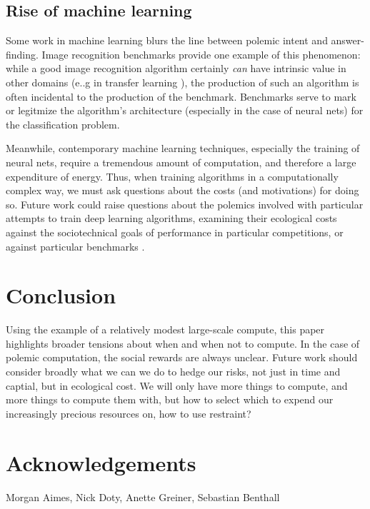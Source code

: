 \documentclass[sigconf]{acmart}
\begin{document}
\subsection{Rise of machine learning}
\label{sec:org61152f0}

Some work in machine learning blurs the line 
between polemic intent and answer-finding.
Image recognition benchmarks provide one example of this phenomenon:
while a good image recognition algorithm certainly \emph{can} have intrinsic value in other domains 
(e..g in transfer learning \cite{Jean2016c}),
the production of such an algorithm is often incidental to the production of the benchmark.
Benchmarks serve to mark or legitmize the algorithm's architecture (especially in the case of neural nets)
for the classification problem.

Meanwhile, contemporary machine learning techniques, especially the training of neural nets, 
require a tremendous amount of computation, and therefore a large expenditure of energy.
Thus, when training algorithms in a computationally complex way,
we must ask questions about the costs (and motivations) for doing so.
Future work could raise questions about the polemics involved
with particular attempts to train deep learning algorithms,
examining their ecological costs against the sociotechnical goals 
of performance in particular competitions, or against particular benchmarks \cite{SixSilberman2015}.


\section{Conclusion}
\label{sec:orgcca7631}

Using the example of a relatively modest large-scale compute,
this paper highlights broader tensions about when and when not to compute.
In the case of polemic computation, the social rewards are always unclear.
Future work should consider broadly what we can we do to hedge our risks, 
not just in time and captial,
but in ecological cost.
We will only have more things to compute,
and more things to compute them with,
but how to select which to expend our increasingly precious resources on, 
how to use restraint?


\section{Acknowledgements}
\label{sec:org4a535ec}
Morgan Aimes, Nick Doty, Anette Greiner, Sebastian Benthall



\end{document}
